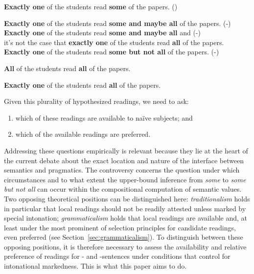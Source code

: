 \documentclass[fleqn,reqno,10pt,draft]{article}
\newcommand{\lit}{\acro{lit}}
\newcommand{\glb}{\acro{glb}}
\newcommand{\loc}{\acro{loc}}
\newcommand{\as}{\acro{as}}
\renewcommand{\es}{\acro{es}}
\renewcommand{\mymark}[1]{\textbf{#1}}
\begin{document}
\begin{exe}
\ex  \label{bsp:GE} \mymark{Exactly one} of the students read {\mymark{some}} of the
  papers. \hfill{(\es)}

  \begin{xlist}
  \ex \label{bsp:GE-Literal} \mymark{Exactly one} of the students read
    {\mymark{some and maybe all}} of the papers. \hfill (\es-\lit)
  \ex \label{bsp:GE-Global}
    \mymark{Exactly one} of the students read \mymark{some and maybe all} 
    and  \hfill (\es-\glb)\\
    it's not the case that \mymark{exactly one} of the students read \mymark{all} of the papers.
  \ex \label{bsp:GE-Local}
    \mymark{Exactly one} of the students read {\mymark{some  but not all}} of the
    papers. \hfill (\es-\loc)
  \end{xlist}
\end{exe}


\begin{exe}
\ex \label{bsp:AE-Alternative} \mymark{All} of the students read
  {\mymark{all}} of the papers. 

\ex \label{bsp:GE-Alternative} \mymark{Exactly one} of the students
  read {\mymark{all}} of the papers.
\end{exe}


\noindent Given this plurality of hypothesized readings, we need to
ask:
\begin{enumerate}[Q1:]
\item which of these readings are available to na\"{i}ve subjects; and
\item which of the available readings are preferred.
\end{enumerate}
Addressing these questions empirically is relevant because they lie at
the heart of the current debate about the exact location and nature of
the interface between semantics and pragmatics. The controversy
concerns the question under which circumstances and to what extent the
upper-bound inference from \emph{some} to \emph{some but not all} can
occur within the compositional computation of semantic values. Two
opposing theoretical positions can be distinguished here:
\emph{traditionalism} holds in particular that local readings should
not be readily attested unless marked by special intonation;
\emph{grammaticalism} holds that local readings are available and, at
least under the most prominent of selection principles for candidate
readings, even preferred (see Section~\ref{sec:grammaticalism}). To
distinguish between these opposing positions, it is therefore
necessary to assess the availability and relative preference of
readings for \as- and \es-sentences under conditions that control for
intonational markedness. This is what this paper aims to do.
\end{document}
